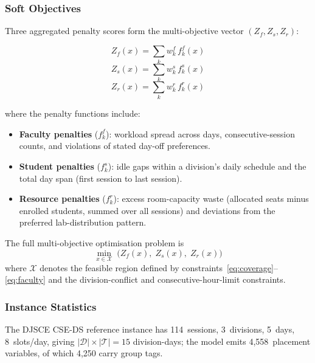 \documentclass[conference]{IEEEtran}
\begin{document}
\subsubsection{Soft Objectives}\label{sec:objectives}

Three aggregated penalty scores form the multi-objective vector
$(Z_f, Z_s, Z_r)$:

\begin{equation}
  Z_f(x) = \sum_{k} w^f_k \, f^f_k(x)
  \label{eq:zf}
\end{equation}
\begin{equation}
  Z_s(x) = \sum_{k} w^s_k \, f^s_k(x)
  \label{eq:zs}
\end{equation}
\begin{equation}
  Z_r(x) = \sum_{k} w^r_k \, f^r_k(x)
  \label{eq:zr}
\end{equation}

where the penalty functions include:
\begin{itemize}
  \item \textbf{Faculty penalties} ($f^f_k$): workload spread across days,
        consecutive-session counts, and violations of stated day-off
        preferences.
  \item \textbf{Student penalties} ($f^s_k$): idle gaps within a division's
        daily schedule and the total day span (first session to last session).
  \item \textbf{Resource penalties} ($f^r_k$): excess room-capacity waste
        (allocated seats minus enrolled students, summed over all sessions)
        and deviations from the preferred lab-distribution pattern.
\end{itemize}

The full multi-objective optimisation problem is
\begin{equation}
  \min_{x \in \mathcal{X}}\; \bigl(Z_f(x),\; Z_s(x),\; Z_r(x)\bigr)
  \label{eq:moo}
\end{equation}
where $\mathcal{X}$ denotes the feasible region defined by
constraints~\eqref{eq:coverage}--\eqref{eq:faculty} and the division-conflict
and consecutive-hour-limit constraints.

\subsubsection{Instance Statistics}
The DJSCE CSE-DS reference instance has 114~sessions, 3~divisions,
5~days, 8~slots/day, giving $|\mathcal{D}|\times|\mathcal{T}|=15$
division-days; the model emits 4,558~placement variables, of which 4,250
carry group tags.
\end{document}
